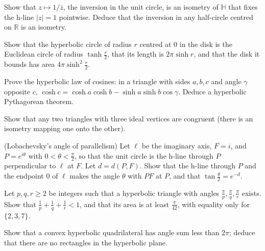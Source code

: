 \begin{exercise}[$\star$]\label{geometry:ex:inversioniso}
Show that $z\mapsto1/\bar z$, the inversion in the unit circle, is an isometry of $\mathbb H$ that fixes the h-line $|z|=1$ pointwise. Deduce that the
inversion in any half-circle centred on $\mathbb R$ is an isometry.
\end{exercise}

\begin{exercise}[$\star\star$]\label{geometry:ex:circles}
Show that the hyperbolic circle of radius $r$ centred at $0$ in the disk is the Euclidean circle of radius $\tanh\frac r2$, that its length is $2\pi\sinh r$, and
that the disk it bounds has area $4\pi\sinh^2\frac r2$.
\end{exercise}

\begin{exercise}[$\star\star$]\label{geometry:ex:hypcos}
Prove the hyperbolic law of cosines: in a triangle with sides $a,b,c$ and angle $\gamma$ opposite $c$,
$\cosh c=\cosh a\cosh b-\sinh a\sinh b\cos\gamma$. Deduce a hyperbolic Pythagorean theorem.
\end{exercise}

\begin{exercise}[$\star$]\label{geometry:ex:ideal}
Show that any two triangles with three ideal vertices are congruent (there is an isometry mapping one onto the other).
\end{exercise}

\begin{exercise}[$\star\star$]\label{geometry:ex:parallelangle}
(Lobachevsky's angle of parallelism) Let $\ell$ be the imaginary axis, $F=i$, and $P=e^{i\theta}$ with $0<\theta<\frac\pi2$, so that the unit circle is the
h-line through $P$ perpendicular to $\ell$ at $F$. Let $d=d(P,F)$. Show that the h-line through $P$ and the endpoint $0$ of $\ell$ makes the angle $\theta$
with $PF$ at $P$, and that $\tan\frac\theta2=e^{-d}$.
\end{exercise}

\begin{exercise}[$\star$]\label{geometry:ex:tilings}
Let $p,q,r\ge2$ be integers such that a hyperbolic triangle with angles $\frac\pi p,\frac\pi q,\frac\pi r$ exists. Show that
$\frac1p+\frac1q+\frac1r<1$, and that its area is at least $\frac\pi{42}$, with equality only for $\{2,3,7\}$.
\end{exercise}

\begin{exercise}[$\star\star$]\label{geometry:ex:quadrilateral}
Show that a convex hyperbolic quadrilateral has angle sum less than $2\pi$; deduce that there are no rectangles in the hyperbolic plane.
\end{exercise}

